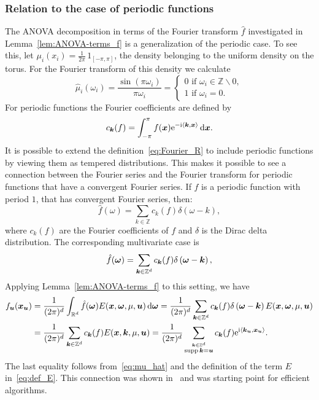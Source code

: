 \documentclass{article}
\renewcommand{\vec}[1]{\ensuremath \mathbf{\boldsymbol{#1}}}
\newcommand{\w}{\ensuremath{\vec \omega}}
\newcommand{\x}{\ensuremath{\vec x}}
\newcommand{\Z}{\ensuremath{\mathbb{Z}}}
\newcommand{\R}{\ensuremath{\mathbb{R}}}
\newcommand{\e}{\mathrm{e}}
\newcommand{\im}{\mathrm{i}}
\DeclareMathOperator*{\supp}{supp}
\renewcommand{\d}{\, \mathrm{d}}
\theoremstyle{definition}
\numberwithin{equation}{section}
\begin{document}
\subsubsection*{Relation to the case of periodic functions}
The ANOVA decomposition in terms of the Fourier transform $\hat f$ investigated in Lemma~\ref{lem:ANOVA-terms_f} is a generalization of the periodic case. To see this, let $\mu_i(x_i) = \frac{1}{2\pi }\, 1_{[- \pi , \pi]}$, the density belonging to the uniform density on the torus.  
For the Fourier transform of this density we calculate
\begin{equation}\label{eq:mu_hat}
\hat{\mu}_i(\omega_i) = \frac{\sin(\pi \omega_i)}{\pi\omega_i}
=\begin{cases}
0 \text{ if } \omega_i \in \Z\backslash 0,\\
1 \text{ if } \omega_i= 0.
\end{cases}
\end{equation}
For periodic functions the Fourier coefficients are defined by
$$c_{\vec k}(f) = \int_{-\pi }^\pi f(\x) \e^{-\im \langle \vec k,\x\rangle}\d \vec x.$$
It is possible to extend the definition~\eqref{eq:Fourier_R} to include periodic functions by viewing them as tempered distributions. This makes it possible to see a connection between the Fourier series and the Fourier transform for periodic functions that have a convergent Fourier series. If $f$ is a periodic function with period $1$, that has convergent Fourier series, then:
$$\hat f(\omega) = \sum_{k \in \Z} c_k(f) \delta\left(\omega -k\right),$$
where $c_k(f)$ are the Fourier coefficients of $f$ and $\delta$ is the Dirac delta distribution. The corresponding multivariate case is
$$\hat f(\w) =  \sum_{\vec k \in \Z^d} c_{\vec k}(f) \delta\left(\w -\vec k\right),$$
Applying Lemma~\ref{lem:ANOVA-terms_f} to this setting, we have
\begin{align*}
f_{\vec u}(\vec x_{\vec u}) 
&= \frac{1}{(2\pi)^d}\int_{\R^d} \hat{f}(\w)E(\x,\w,\mu, \vec u)   \d \w
=   \frac{1}{(2\pi)^d}\sum_{\vec k \in \Z^d} c_{\vec k}(f) \delta\left(\w -\vec k\right) E(\x,\w,\mu, \vec u)   \\
&= \frac{1}{(2\pi)^d} \sum_{\vec k \in \Z^d} c_{\vec k}(f) E(\x,\vec k,\mu, \vec u)   
=   \frac{1}{(2\pi)^d}\sum_{\stackrel{\vec k \in \Z^d}{\supp \vec k =\vec u} } c_{\vec k}(f)\e^{\im \langle \vec k_{\vec u},\vec x_{\vec u}\rangle} .
\end{align*}
The last equality follows from~\eqref{eq:mu_hat} and the definition of the term $E$ in~\eqref{eq:def_E}. This connection was shown in~\cite{PoSc19a} and was starting point for efficient algorithms.
\end{document}
